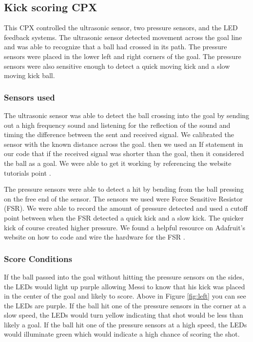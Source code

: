 \documentclass[12pt]{article}
\begin{document}

\subsection{Kick scoring CPX}

This CPX controlled the ultrasonic sensor, two pressure sensors, and the LED feedback systems. The ultrasonic sensor detected movement across the goal line and was able to recognize that a ball had crossed in its path. The pressure sensors were placed in the lower left and right corners of the goal. The pressure sensors were also sensitive enough to detect a quick moving kick and a slow moving kick ball. 

\subsubsection{Sensors used}

The ultrasonic sensor was able to detect the ball crossing into the goal by sending out a high frequency sound and listening for the reflection of the sound and timing the difference between the sent and received signal. We calibrated the sensor with the known distance across the goal. then we used an If statement in our code that if the received signal was shorter than the goal, then it considered the ball as a goal. We were able to get it working by referencing the website tutorials point \cite{tutorialspoint}. %

The pressure sensors were able to detect a hit by bending from the ball pressing on the free end of the sensor. The sensors we used were Force Sensitive Resistor (FSR). We were able to record the amount of pressure detected and used a cutoff point between when the FSR detected a quick kick and a slow kick. The quicker kick of course created higher pressure. We found a helpful resource on Adafruit's website on how to code and wire the hardware for the FSR \cite{Adafruit}. %


\subsubsection{Score Conditions}
If the ball passed into the goal without hitting the pressure sensors on the sides, the LEDs would light up purple allowing Messi to know that his kick was placed in the center of the goal and likely to score. Above in Figure \ref{fig:left} you can see the LEDs are purple. If the ball hit one of the pressure sensors in the corner at a slow speed, the LEDs would turn yellow indicating that shot would be less than likely a goal. If the ball hit one of the pressure sensors at a high speed, the LEDs would illuminate green which would indicate a high chance of scoring the shot. 
\end{document}
